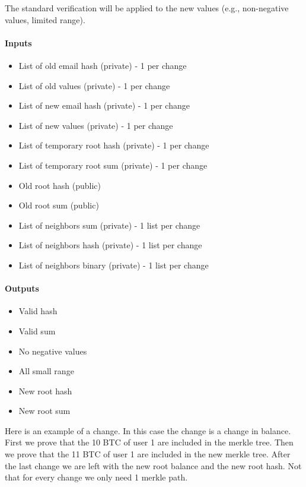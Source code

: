 The standard verification will be applied to the new values (e.g., non-negative values, limited range).

\paragraph{Inputs}
\begin{itemize}
   \item List of old email hash (private) - 1 per change
   \item List of old values (private) - 1 per change
   \item List of new email hash (private) - 1 per change
   \item List of new values (private) - 1 per change
   \item List of temporary root hash (private) - 1 per change
   \item List of temporary root sum (private) - 1 per change
   \item Old root hash (public)
   \item Old root sum (public)
   \item List of neighbors sum (private) - 1 list per change
   \item List of neighbors hash (private) - 1 list per change
   \item List of neighbors binary (private) - 1 list per change
\end{itemize}

\paragraph{Outputs}
\begin{itemize}
   \item Valid hash
   \item Valid sum
   \item No negative values
   \item All small range
   \item New root hash 
   \item New root sum
   \end{itemize}

Here is an example of a change. In this case the change is a change in balance. First we prove that the 10 BTC of user 1 are 
included in the merkle tree. Then we prove that the 11 BTC of user 1 are included in the new merkle tree. After the last change we are left
with the new root balance and the new root hash. Not that for every change we only need 1 merkle path.

